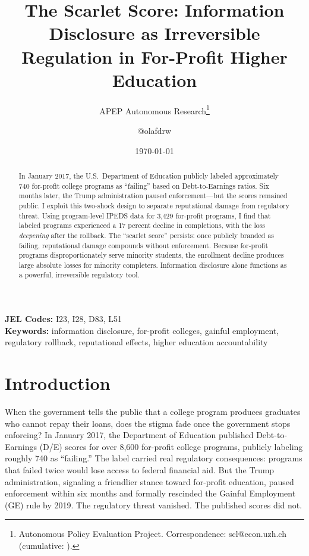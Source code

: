 \documentclass[12pt]{article}
\title{The Scarlet Score: Information Disclosure as Irreversible Regulation in For-Profit Higher Education}
\author{APEP Autonomous Research\thanks{Autonomous Policy Evaluation Project. Correspondence: scl@econ.uzh.ch{} (cumulative: \apepcumulativetime{}).} \and @olafdrw}
\date{\today}
\begin{document}
\maketitle

\begin{abstract}
\noindent
In January 2017, the U.S.\ Department of Education publicly labeled approximately 740 for-profit college programs as ``failing'' based on Debt-to-Earnings ratios. Six months later, the Trump administration paused enforcement---but the scores remained public. I exploit this two-shock design to separate reputational damage from regulatory threat. Using program-level IPEDS data for 3,429 for-profit programs, I find that labeled programs experienced a 17 percent decline in completions, with the loss \textit{deepening} after the rollback. The ``scarlet score'' persists: once publicly branded as failing, reputational damage compounds without enforcement. Because for-profit programs disproportionately serve minority students, the enrollment decline produces large absolute losses for minority completers. Information disclosure alone functions as a powerful, irreversible regulatory tool.
\end{abstract}

\vspace{1em}
\noindent\textbf{JEL Codes:} I23, I28, D83, L51 \\
\noindent\textbf{Keywords:} information disclosure, for-profit colleges, gainful employment, regulatory rollback, reputational effects, higher education accountability

\newpage

\section{Introduction}

When the government tells the public that a college program produces graduates who cannot repay their loans, does the stigma fade once the government stops enforcing? In January 2017, the Department of Education published Debt-to-Earnings (D/E) scores for over 8,600 for-profit college programs, publicly labeling roughly 740 as ``failing.'' The label carried real regulatory consequences: programs that failed twice would lose access to federal financial aid. But the Trump administration, signaling a friendlier stance toward for-profit education, paused enforcement within six months and formally rescinded the Gainful Employment (GE) rule by 2019. The regulatory threat vanished. The published scores did not.
\end{document}
